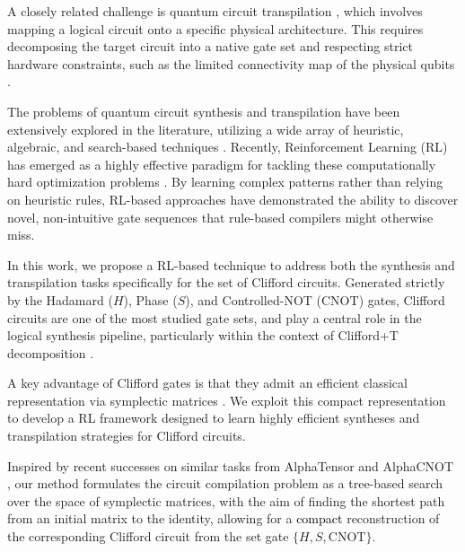 \documentclass[conference]{IEEEtran}
\newcommand{\nt}[1]{\textcolor{black}{#1}}
\newcommand{\CNOT}{\ensuremath{\text{CNOT}}\xspace}
\begin{document}
A closely related challenge is quantum circuit transpilation \cite{compilerdesign, compilersmappingrouting}, which involves mapping a logical circuit onto a specific physical architecture. This requires decomposing the target circuit into a native gate set and respecting strict hardware constraints, such as the limited connectivity map of the physical qubits \cite{preskill2018quantumcomputingin}.

The problems of quantum circuit synthesis and transpilation have been extensively explored in the literature, utilizing a wide array of heuristic, algebraic, and search-based techniques \cite{amy_meet_middle_2013, Q2019, Q20192, Q2023}.
Recently, Reinforcement Learning (RL) has emerged as a highly effective paradigm for tackling these computationally hard optimization problems \cite{alphatensor_quantum, wang2024quantumcompilingreinforcementlearning, kremer2025optimizingnoncliffordcountunitarysynthesis, puviani25, QCGame, Kundu_2025, romanello2025CNOT, KremerIBM, cossio2026alphacnotlearningcnotminimization, equivariant_clifford}. By learning complex patterns rather than relying  on heuristic rules, RL-based approaches have demonstrated the ability to discover novel, non-intuitive gate sequences that rule-based compilers might otherwise miss.

In this work, we propose a RL-based technique to address both the synthesis and transpilation tasks specifically for the set of Clifford circuits. Generated strictly by the Hadamard ($H$), Phase ($S$), and Controlled-NOT (\CNOT) gates, Clifford circuits are one of the most studied gate sets, and play a central role in the logical synthesis pipeline, particularly within the context of Clifford+T decomposition \cite{kremer2025optimizingnoncliffordcountunitarysynthesis}.

A key advantage of Clifford gates is that they admit an efficient classical representation via symplectic matrices \cite{AG_for_clifford}. We exploit this compact representation to develop a RL framework designed to learn highly efficient syntheses and transpilation strategies for Clifford circuits.

Inspired by recent successes on similar tasks from AlphaTensor  \cite{alphatensor_quantum} and AlphaCNOT \cite{cossio2026alphacnotlearningcnotminimization}, our method formulates the circuit compilation problem as a tree-based search over the space of symplectic matrices, with the aim of finding the shortest path from an initial matrix to the identity, allowing for a \nt{compact} reconstruction of the corresponding Clifford circuit from the set gate $\{H, S, \CNOT\}$.
\end{document}
